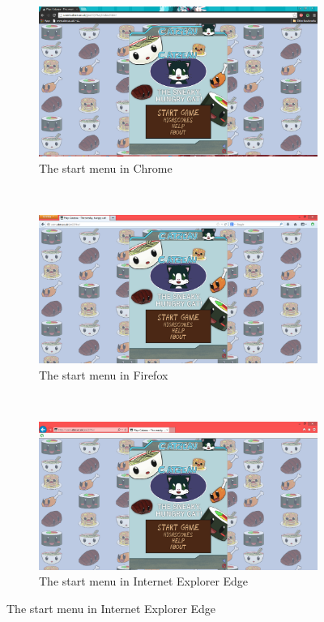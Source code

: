\documentclass{article}
\begin{document}
\begin{figure}[H]
        \centering
        \begin{subfigure}[b]{0.4\textwidth}
                \includegraphics[width=\textwidth]{img/testing/chrome_start.png}
                \caption{The start menu in Chrome}
                \label{fig:chromestart}
        \end{subfigure}
        ~%
        \begin{subfigure}[b]{0.4\textwidth}
                \includegraphics[width=\textwidth]{img/testing/ff_start.png}
                \caption{The start menu in Firefox}
                \label{fig:firefoxstart}
        \end{subfigure}
	~
        \begin{subfigure}[b]{0.4\textwidth}
                \includegraphics[width=\textwidth]{img/testing/ie_start.png}
                \caption{The start menu in Internet Explorer Edge}
                \label{fig:iestart}
        \end{subfigure}
\end{figure}
\end{document}
